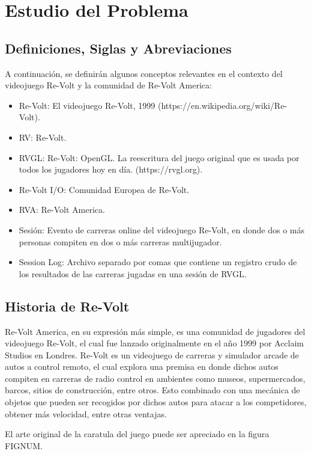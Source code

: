 \chapter{Estudio del Problema}

\section{Definiciones, Siglas y Abreviaciones}
A continuación, se definirán algunos conceptos relevantes en el contexto del videojuego Re-Volt y la comunidad de Re-Volt America:

\begin{itemize}
	\item Re-Volt: El videojuego Re-Volt, 1999 (https://en.wikipedia.org/wiki/Re-Volt).
	\item RV: Re-Volt.
	\item RVGL: Re-Volt: OpenGL. La reescritura del juego original que es usada por todos los jugadores hoy en día. (https://rvgl.org).
	\item Re-Volt I/O: Comunidad Europea de Re-Volt.
	\item RVA: Re-Volt America.
	\item Sesión: Evento de carreras online del videojuego Re-Volt, en donde dos o más personas compiten en dos o más carreras multijugador.
	\item Session Log: Archivo separado por comas que contiene un registro crudo de los resultados de las carreras jugadas en una sesión de RVGL.
\end{itemize}

\section{Historia de Re-Volt}
Re-Volt America, en su expresión más simple, es una comunidad de jugadores del videojuego Re-Volt, el cual fue lanzado originalmente en el año 1999 por Acclaim Studios en Londres. Re-Volt es un videojuego de carreras y simulador arcade de autos a control remoto, el cual explora una premisa en donde dichos autos compiten en carreras de radio control en ambientes como museos, supermercados, barcos, sitios de construcción, entre otros. Esto combinado con una mecánica de objetos que pueden ser recogidos por dichos autos para atacar a los competidores, obtener más velocidad, entre otras ventajas.

El arte original de la caratula del juego puede ser apreciado en la figura FIGNUM.

